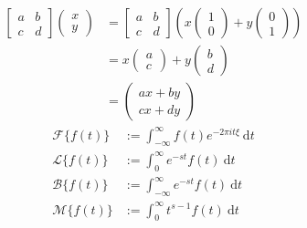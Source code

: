 \documentclass[a4paper,11pt]{article}
\theoremstyle{plain}
\theoremstyle{definition}
\newcommand{\dx}{\text{d}}
\begin{document}
\begin{equation}
\begin{aligned}	
	\begin{bmatrix}a & b\\c & d\end{bmatrix}\begin{pmatrix}x \\y\end{pmatrix}
					 &=
	\begin{bmatrix}
		a & b \\
		c & d
	\end{bmatrix}
	\left(
	x
	\begin{pmatrix}
		1 \\
		0
	\end{pmatrix}
	+
	y
	\begin{pmatrix}
		0 \\
		1
	\end{pmatrix}
	\right)\\
	&=
	x\begin{pmatrix}a \\c\end{pmatrix}
	+y\begin{pmatrix}b \\d\end{pmatrix}\\
	&=\begin{pmatrix}ax+by \\cx+dy\end{pmatrix}


\end{aligned}	
\end{equation}
\begin{equation}
\begin{aligned}	
	\mathcal{F}\{f(t)\}&:=\int_{-\infty}^\infty f(t)e^{-2\pi it\xi}\ \dx t\\
	\mathcal{L}\{f(t)\}&:=\int_0^\infty e^{-st}f(t)\ \dx t\\
	\mathcal{B}\{f(t)\}&:=\int_{-\infty}^{\infty}e^{-st}f(t)\ \dx t\\
	\mathcal{M}\{f(t)\}&:=\int_0^\infty t^{s-1}f(t)\ \dx t\\
\end{aligned}	
\end{equation}
\end{document}
